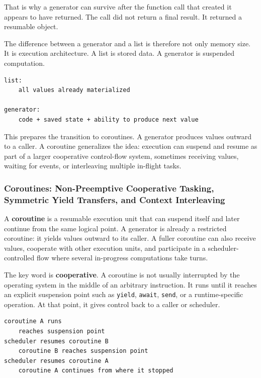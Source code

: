 That is why a generator can survive after the function call that created it appears to have returned. The call did not return a final result. It returned a resumable object.

The difference between a generator and a list is therefore not only memory size. It is execution architecture. A list is stored data. A generator is suspended computation.

\begin{verbatim}
list:
    all values already materialized

generator:
    code + saved state + ability to produce next value
\end{verbatim}

This prepares the transition to coroutines. A generator produces values outward to a caller. A coroutine generalizes the idea: execution can suspend and resume as part of a larger cooperative control-flow system, sometimes receiving values, waiting for events, or interleaving multiple in-flight tasks.



\subsubsection{Coroutines: Non-Preemptive Cooperative Tasking, Symmetric Yield Transfers, and Context Interleaving}

A \textbf{coroutine} is a resumable execution unit that can suspend itself and later continue from the same logical point. A generator is already a restricted coroutine: it yields values outward to its caller. A fuller coroutine can also receive values, cooperate with other execution units, and participate in a scheduler-controlled flow where several in-progress computations take turns.

The key word is \textbf{cooperative}. A coroutine is not usually interrupted by the operating system in the middle of an arbitrary instruction. It runs until it reaches an explicit suspension point such as \texttt{yield}, \texttt{await}, \texttt{send}, or a runtime-specific operation. At that point, it gives control back to a caller or scheduler.

\begin{verbatim}
coroutine A runs
    reaches suspension point
scheduler resumes coroutine B
    coroutine B reaches suspension point
scheduler resumes coroutine A
    coroutine A continues from where it stopped
\end{verbatim}

